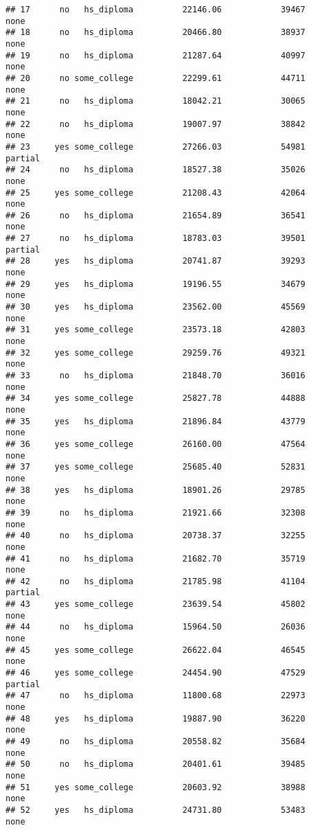 \documentclass[
]{article}
\begin{document}
\begin{verbatim}
## 17      no   hs_diploma          22146.06            39467        none
## 18      no   hs_diploma          20466.80            38937        none
## 19      no   hs_diploma          21287.64            40997        none
## 20      no some_college          22299.61            44711        none
## 21      no   hs_diploma          18042.21            30065        none
## 22      no   hs_diploma          19007.97            38842        none
## 23     yes some_college          27266.03            54981     partial
## 24      no   hs_diploma          18527.38            35026        none
## 25     yes some_college          21208.43            42064        none
## 26      no   hs_diploma          21654.89            36541        none
## 27      no   hs_diploma          18783.03            39501     partial
## 28     yes   hs_diploma          20741.87            39293        none
## 29     yes   hs_diploma          19196.55            34679        none
## 30     yes   hs_diploma          23562.00            45569        none
## 31     yes some_college          23573.18            42803        none
## 32     yes some_college          29259.76            49321        none
## 33      no   hs_diploma          21848.70            36016        none
## 34     yes some_college          25827.78            44888        none
## 35     yes   hs_diploma          21896.84            43779        none
## 36     yes some_college          26160.00            47564        none
## 37     yes some_college          25685.40            52831        none
## 38     yes   hs_diploma          18901.26            29785        none
## 39      no   hs_diploma          21921.66            32308        none
## 40      no   hs_diploma          20738.37            32255        none
## 41      no   hs_diploma          21682.70            35719        none
## 42      no   hs_diploma          21785.98            41104     partial
## 43     yes some_college          23639.54            45802        none
## 44      no   hs_diploma          15964.50            26036        none
## 45     yes some_college          26622.04            46545        none
## 46     yes some_college          24454.90            47529     partial
## 47      no   hs_diploma          11800.68            22973        none
## 48     yes   hs_diploma          19887.90            36220        none
## 49      no   hs_diploma          20558.82            35684        none
## 50      no   hs_diploma          20401.61            39485        none
## 51     yes some_college          20603.92            38988        none
## 52     yes   hs_diploma          24731.80            53483        none

\end{verbatim}
\end{document}

